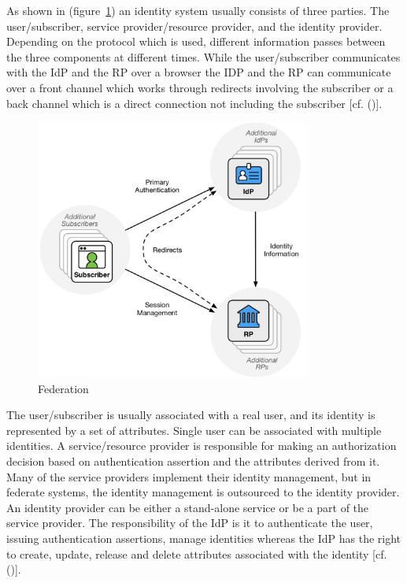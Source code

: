 {{	
	As shown in (figure~\ref{fig:federation}) an identity system usually consists of three parties. The user/subscriber, service provider/resource provider, and the identity provider. Depending on the protocol which is used, different information passes between the three components at different times. While the user/subscriber communicates with the IdP and the RP over a browser the IDP and the RP can communicate over a front channel which works through redirects involving the subscriber or a back channel which is a direct connection not including the subscriber [cf. (\cite{NIST:2017:DIGFA})]. 
	\begin{figure}[h]
		\centering
		\includegraphics[width=0.8\textwidth]{images/federation}
		\caption[Federation]{Federation}
		\label{fig:federation}
	\end{figure}
	
	
	The user/subscriber is usually associated with a real user, and its identity is represented by a set of attributes. Single user can be associated with multiple identities. A service/resource provider is responsible for making an authorization decision based on authentication assertion and the attributes derived from it. Many of the service providers implement their identity management, but in federate systems, the identity management is outsourced to the identity provider. An identity provider can be either a stand-alone service or be a part of the service provider. The responsibility of the IdP is it to authenticate the user, issuing authentication assertions, manage identities whereas the IdP has the right to create, update, release and delete attributes associated with the identity [cf. (\cite{Birell:2013:FIMS})]. 
	
}}
